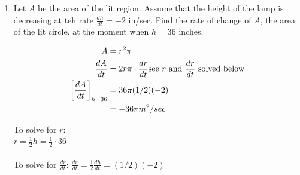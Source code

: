 \documentclass[nooutcomes]{ximera}
\begin{document}
\begin{problem}
\begin{enumerate}
	\item Let $A$ be the area of the lit region.  Assume that the height of the lamp is decreasing at teh rate $\frac{dh}{dt}=-2$ in/sec.  Find the rate of change of $A$, the area of the lit circle, at the moment when $h=36$ inches. 
	\begin{freeResponse}
	\begin{align*}
	A&=r^2\pi\\
	\frac{dA}{dt}&=2r\pi \cdot \frac{dr}{dt} \text{see $r$ and $\frac{dr}{dt}$ solved below}\\
	\bigg[ \frac{dA}{dt} \bigg]_{h=36}&=36 \pi (1/2)(-2)\\
	&=-36 \pi m^2/sec
	\end{align*}

To solve for $r$:\\
$r=\frac{1}{2}h=\frac{1}{2}\cdot 36$\\\\

To solve for $\frac{dr}{dt}$:
$\frac{dr}{dt} =\frac{1}{2}\frac{dh}{dt}=(1/2)(-2)$

\end{freeResponse}
\end{enumerate}
\end{problem}
\end{document}
